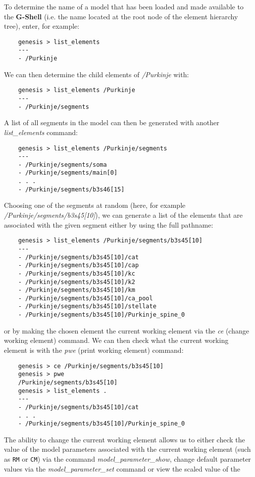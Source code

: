 \documentclass[12pt]{article}
\begin{document}
To determine the name of a model that has been loaded and made available to the {\bf G-Shell} (i.e. the name located at the root node of the element hierarchy tree), enter, for example: 
\begin{verbatim}
    genesis > list_elements
    ---
    - /Purkinje
\end{verbatim}
We can then determine the child elements of {\it /Purkinje} with:
\begin{verbatim}
    genesis > list_elements /Purkinje
    ---
    - /Purkinje/segments
\end{verbatim}
A list of all segments in the model can then be generated with another {\it list\_elements} command:
\begin{verbatim}
    genesis > list_elements /Purkinje/segments
    ---
    - /Purkinje/segments/soma
    - /Purkinje/segments/main[0]
    . . .
    - /Purkinje/segments/b3s46[15]
\end{verbatim}
Choosing one of the segments at random (here, for example {\it /Purkinje/segments/b3s45[10]}), we can generate a list of the elements that are associated with the given segment either by using the full pathname:
\begin{verbatim}
    genesis > list_elements /Purkinje/segments/b3s45[10]
    ---
    - /Purkinje/segments/b3s45[10]/cat
    - /Purkinje/segments/b3s45[10]/cap
    - /Purkinje/segments/b3s45[10]/kc
    - /Purkinje/segments/b3s45[10]/k2
    - /Purkinje/segments/b3s45[10]/km
    - /Purkinje/segments/b3s45[10]/ca_pool
    - /Purkinje/segments/b3s45[10]/stellate
    - /Purkinje/segments/b3s45[10]/Purkinje_spine_0
\end{verbatim}
or by making the chosen element the current working element via the {\it ce} (change working element) command. We can then check what the current working element is with the {\it pwe} (print working element) command:
\begin{verbatim}
    genesis > ce /Purkinje/segments/b3s45[10]
    genesis > pwe
    /Purkinje/segments/b3s45[10]
    genesis > list_elements .
    ---
    - /Purkinje/segments/b3s45[10]/cat
    . . .
    - /Purkinje/segments/b3s45[10]/Purkinje_spine_0
\end{verbatim}
The ability to change the current working element allows us to either
check the value of the model parameters associated with the current
working element (such as {\tt RM} or {\tt CM}) via the command {\it
  model\_parameter\_show}, change default parameter values via the
{\it model\_parameter\_set} command or view the scaled value of the
\end{document}
